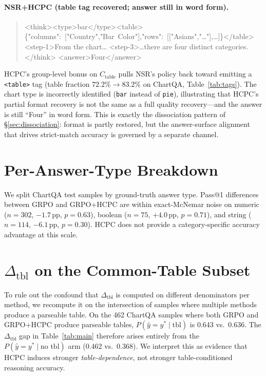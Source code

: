 \documentclass[11pt]{article}
\begin{document}
\paragraph{NSR+HCPC (table tag recovered; answer still in word
form).}
\begin{quote}\footnotesize\ttfamily
<{}think><{}type>bar</type><{}table>\{"columns":~["Country","Bar~Color"],"rows":~[["Asians","\dots"],\dots]\}</table>
<{}step-1>From the chart\dots
<{}step-3>\dots there are four distinct categories.
</think>
<{}answer>Four</answer>
\end{quote}
HCPC's group-level bonus on $C_{\text{table}}$ pulls NSR's policy
back toward emitting a \texttt{<table>} tag (table fraction
$72.2\%\!\to\!83.2\%$ on ChartQA, Table~\ref{tab:tags}). The chart
type is incorrectly identified (\texttt{bar} instead of \texttt{pie}),
illustrating that HCPC's partial format recovery is not the same as a
full quality recovery---and the answer is still ``Four'' in word
form. This is exactly the dissociation pattern of
\S\ref{sec:dissociation}: format is partly restored, but the
answer-surface alignment that drives strict-match accuracy is
governed by a separate channel.

\section{Per-Answer-Type Breakdown}

We split ChartQA test samples by ground-truth answer type. Pass@1
differences between \textsc{GRPO} and \textsc{GRPO+HCPC} are within
exact-McNemar noise on numeric ($n{=}302$, $-1.7$\,pp, $p{=}0.63$),
boolean ($n{=}75$, $+4.0$\,pp, $p{=}0.71$), and string ($n{=}114$,
$-6.1$\,pp, $p{=}0.30$). HCPC does not provide a category-specific
accuracy advantage at this scale.

\section{$\Delta_{\text{tbl}}$ on the Common-Table Subset}

To rule out the confound that $\Delta_{\text{tbl}}$ is computed on
different denominators per method, we recompute it on the
intersection of samples where multiple methods produce a parseable
table. On the 462 ChartQA samples where both \textsc{GRPO} and
\textsc{GRPO+HCPC} produce parseable tables,
$P(\hat y=y^*\mid\text{tbl})$ is 0.643 vs.\ 0.636. The
$\Delta_{\text{tbl}}$ gap in Table~\ref{tab:main} therefore arises
entirely from the $P(\hat y=y^*\mid\text{no tbl})$ arm
(0.462 vs.\ 0.368). We interpret this as evidence that HCPC induces
stronger \emph{table-dependence}, not stronger table-conditioned
reasoning accuracy.
\end{document}
